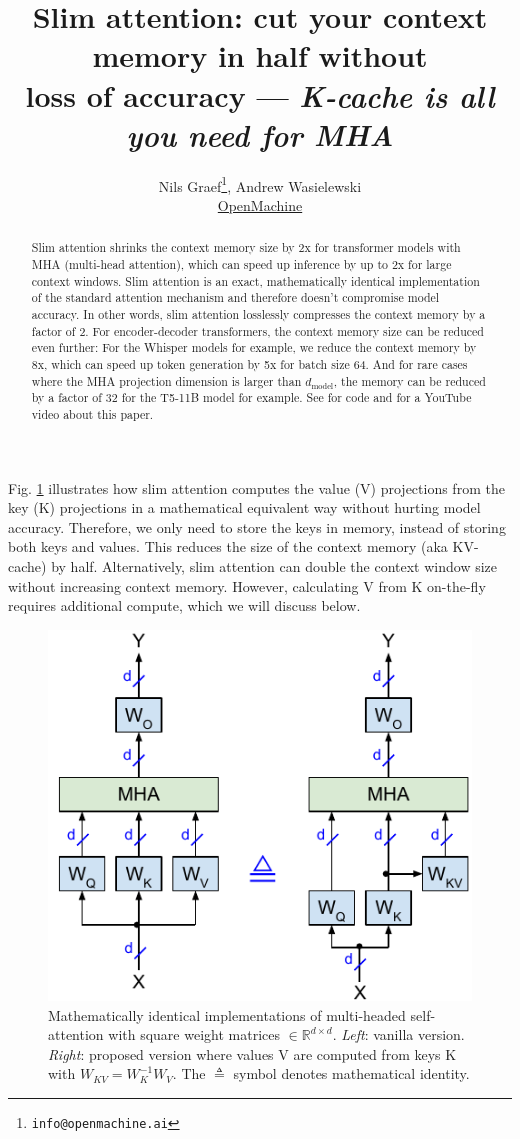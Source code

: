 \documentclass{article}
\title{Slim attention: cut your context memory in half without \\ loss of accuracy --- \emph{K-cache is all you need for MHA}}
\author{Nils Graef\thanks{\texttt{info@openmachine.ai}}, Andrew Wasielewski \\
  \href{https://openmachine.ai}{OpenMachine}}
\newcommand{\eR}[2]{$\in \mathbb{R}^{#1 \times #2}$} %
\begin{document}
 \maketitle

\begin{abstract}
Slim attention shrinks the context memory size by 2x for transformer models with MHA (multi-head attention), which can speed up inference by up to 2x for large context windows. Slim attention is an exact, mathematically identical implementation of the standard attention mechanism and therefore doesn’t compromise model accuracy. In other words, slim attention losslessly compresses the context memory by a factor of 2. For encoder-decoder transformers, the context memory size can be reduced even further: For the Whisper models for example, we reduce the context memory by 8x, which can speed up token generation by 5x for batch size 64. And for rare cases where the MHA projection dimension is larger than $d_{\text{model}}$, the memory can be reduced by a factor of 32 for the T5-11B model for example. See \citep{tricks} for code and \citep{slim-video} for a YouTube video about this paper.
\end{abstract}

Fig. \ref{fig1} illustrates how slim attention computes the value (V) projections from the key (K) projections in a mathematical equivalent way without hurting model accuracy. Therefore, we only need to store the keys in memory, instead of storing both keys and values. This reduces the size of the context memory (aka KV-cache) by half. Alternatively, slim attention can double the context window size without increasing context memory. However, calculating V from K on-the-fly requires additional compute, which we will discuss below.
\begin{figure}[h!] \centering  %
  \includegraphics[scale=0.88]{../doc/fig/slimAttn_fig1.pdf}
  \caption{Mathematically identical implementations of multi-headed self-attention with square weight matrices \eR{d}{d}. \emph{Left}: vanilla version. \emph{Right}: proposed version where values V are computed from keys K with $W_{KV} = W_K^{-1} W_V$. The $\triangleq$ symbol denotes mathematical identity.}
\label{fig1} \end{figure}
\end{document}
